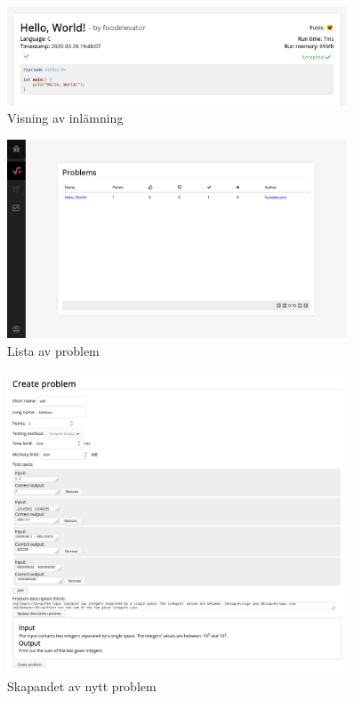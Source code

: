 \documentclass{article}
\begin{document}
\begin{figure}[H]
	\centering
	\includegraphics[width=0.9\textwidth]{submission}
	\caption{Visning av inlämning}
\end{figure}

\begin{figure}[H]
	\centering
	\includegraphics[width=0.9\textwidth]{problem-list}
	\caption{Lista av problem}
\end{figure}

\begin{figure}[H]
	\centering
	\includegraphics[width=0.9\textwidth]{create-problem}
	\caption{Skapandet av nytt problem}
\end{figure}
\end{document}
